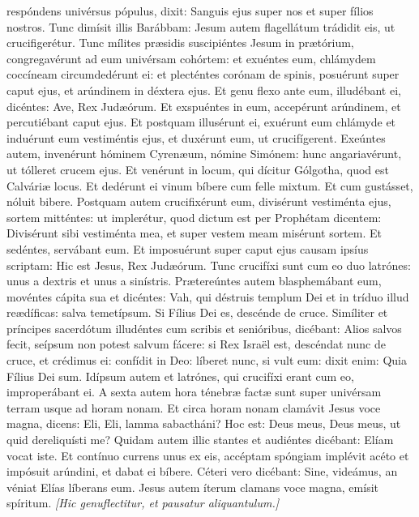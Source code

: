 {{respóndens univérsus pópulus, dixit: Sanguis ejus super nos et super fílios nostros. Tunc dimísit illis Barábbam: Jesum autem flagellátum trádidit eis, ut crucifigerétur. Tunc mílites præsidis suscipiéntes Jesum in prætórium, congregavérunt ad eum univérsam cohórtem: et exuéntes eum, chlámydem coccíneam circumdedérunt ei: et plecténtes corónam de spinis, posuérunt super caput ejus, et arúndinem in déxtera ejus. Et genu flexo ante eum, illudébant ei, dicéntes: Ave, Rex Judæórum. Et exspuéntes in eum, accepérunt arúndinem, et percutiébant caput ejus. Et postquam illusérunt ei, exuérunt eum chlámyde et induérunt eum vestiméntis ejus, et duxérunt eum, ut crucifígerent. Exeúntes autem, invenérunt hóminem Cyrenæum, nómine Simónem: hunc angariavérunt, ut tólleret crucem ejus. Et venérunt in locum, qui dícitur Gólgotha, quod est Calváriæ locus. Et dedérunt ei vinum bíbere cum felle mixtum. Et cum gustásset, nóluit bibere. Postquam autem crucifixérunt eum, divisérunt vestiménta ejus, sortem mitténtes: ut implerétur, quod dictum est per Prophétam dicentem: Divisérunt sibi vestiménta mea, et super vestem meam misérunt sortem. Et sedéntes, servábant eum. Et imposuérunt super caput ejus causam ipsíus scriptam: Hic est Jesus, Rex Judæórum. Tunc crucifíxi sunt cum eo duo latrónes: unus a dextris et unus a sinístris. Prætereúntes autem blasphemábant eum, movéntes cápita sua et dicéntes: Vah, qui déstruis templum Dei et in tríduo illud reædíficas: salva temetípsum. Si Fílius Dei es, descénde de cruce. Simíliter et príncipes sacerdótum illudéntes cum scribis et senióribus, dicébant: Alios salvos fecit, seípsum non potest salvum fácere: si Rex Israël est, descéndat nunc de cruce, et crédimus ei: confídit in Deo: líberet nunc, si vult eum: dixit enim: Quia Fílius Dei sum. Idípsum autem et latrónes, qui crucifíxi erant cum eo, improperábant ei. A sexta autem hora ténebræ factæ sunt super univérsam terram usque ad horam nonam. Et circa horam nonam clamávit Jesus voce magna, dicens: Eli, Eli, lamma sabactháni? Hoc est: Deus meus, Deus meus, ut quid dereliquísti me? Quidam autem illic stantes et audiéntes dicébant: Elíam vocat iste. Et contínuo currens unus ex eis, accéptam spóngiam implévit acéto et impósuit arúndini, et dabat ei bíbere. Céteri vero dicébant: Sine, videámus, an véniat Elías líberans eum. Jesus autem íterum clamans voce magna, emísit spíritum.
\textit{[Hic genuflectitur, et pausatur aliquantulum.]}
}}
